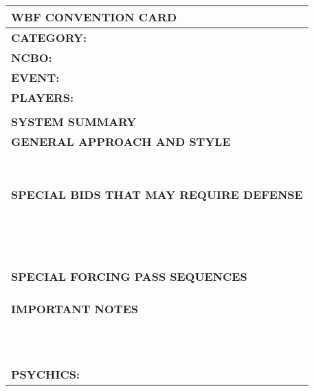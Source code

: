 \documentclass{article}
\begin{document}
\begin{minipage}{90mm}
	\begin{tabular}{| p{88mm} |}
		\hline
		\cellcolor[gray]{0.9} \textbf{WBF CONVENTION CARD} \\ \hline
		\textbf{CATEGORY:} \\
		\textbf{NCBO:} \\
		\textbf{EVENT:} \\
		\textbf{PLAYERS:} \\
		\multirow{2}{*}{} \\
		\\
		\cellcolor[gray]{0.9} \textbf{SYSTEM SUMMARY} \\ \hline
		\textbf{GENERAL APPROACH AND STYLE} \\ \hline
		\\ \hline
		\\ \hline
		\\ \hline
		\\ \hline
		\\ \hline
		\\ \hline
		\\ \hline
		\\ \hline
		\textbf{SPECIAL BIDS THAT MAY REQUIRE DEFENSE} \\ \hline
		\\ \hline
		\\ \hline
		\\ \hline
		\\ \hline
		\\ \hline
		\\ \hline
		\\ \hline
		\\ \hline
		\\ \hline
		\\ \hline
		\\ \hline
		\\ \hline
		\\ \hline
		\\ \hline
		\\ \hline
		\textbf{SPECIAL FORCING PASS SEQUENCES} \\ \hline
		\\ \hline
		\\ \hline
		\\ \hline
		\textbf{IMPORTANT NOTES} \\ \hline
		\\ \hline
		\\ \hline
		\\ \hline
		\\ \hline
		\\ \hline
		\\ \hline
		\\ \hline
		\\ \hline
		\\ \hline
		\\ \hline
		\\ \hline
		\textbf{PSYCHICS:} \\ \hline
	\end{tabular}
\end{minipage}
\end{document}
